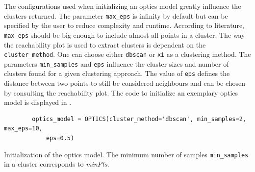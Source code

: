 The configurations used when initializing an \ac{optics} model greatly influence the clusters returned.
The parameter \texttt{max\_eps} is infinity by default but can be specified by the user to reduce complexity and runtime.
According to literature, \texttt{max\_eps} should be big enough to include almost all points in a cluster.
The way the reachability plot is used to extract clusters is dependent on the \texttt{cluster\_method}. 
One can choose either \texttt{dbscan} or \texttt{xi} as a clustering method.
The parameters \texttt{min\_samples} and \texttt{eps} influence the cluster sizes and number of clusters found for a given clustering approach.
The value of \texttt{eps} defines the distance between two points to still be considered neighbours 
and can be chosen by consulting the reachability plot.
The code to initialize an exemplary \ac{optics} model is displayed in .

\begin{listing}[htp]
    \begin{verbatim}
        optics_model = OPTICS(cluster_method='dbscan', min_samples=2, max_eps=10, 
            eps=0.5)
    \end{verbatim}
    \caption[Initialization of the \ac{optics} model]{Initialization of the \ac{optics} model.
    The minimum number of samples \texttt{min\_samples} in a cluster corresponds to \textit{minPts}.
    }
    \label{lst:optics_model}
\end{listing}
